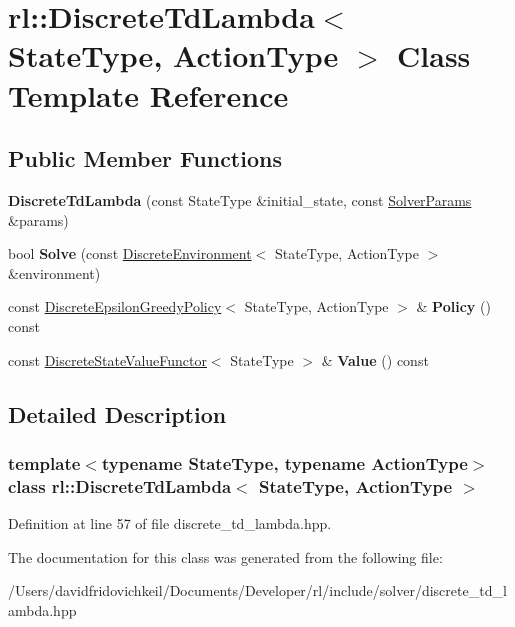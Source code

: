 \hypertarget{classrl_1_1_discrete_td_lambda}{}\section{rl\+:\+:Discrete\+Td\+Lambda$<$ State\+Type, Action\+Type $>$ Class Template Reference}
\label{classrl_1_1_discrete_td_lambda}
\subsection*{Public Member Functions}
\begin{DoxyCompactItemize}
\item 
\hypertarget{classrl_1_1_discrete_td_lambda_a899c3819e15973a6d78c0606c5f3dfb8}{}\label{classrl_1_1_discrete_td_lambda_a899c3819e15973a6d78c0606c5f3dfb8} 
{\bfseries Discrete\+Td\+Lambda} (const State\+Type \&initial\+\_\+state, const \hyperlink{structrl_1_1_solver_params}{Solver\+Params} \&params)
\item 
\hypertarget{classrl_1_1_discrete_td_lambda_a9458f4514c9cabe6083d54f7d9d195d4}{}\label{classrl_1_1_discrete_td_lambda_a9458f4514c9cabe6083d54f7d9d195d4} 
bool {\bfseries Solve} (const \hyperlink{classrl_1_1_discrete_environment}{Discrete\+Environment}$<$ State\+Type, Action\+Type $>$ \&environment)
\item 
\hypertarget{classrl_1_1_discrete_td_lambda_a2415e7f327ed838cac5d792d95dc1cb7}{}\label{classrl_1_1_discrete_td_lambda_a2415e7f327ed838cac5d792d95dc1cb7} 
const \hyperlink{classrl_1_1_discrete_epsilon_greedy_policy}{Discrete\+Epsilon\+Greedy\+Policy}$<$ State\+Type, Action\+Type $>$ \& {\bfseries Policy} () const
\item 
\hypertarget{classrl_1_1_discrete_td_lambda_a7feeec5e60b3ab723e957e767af95211}{}\label{classrl_1_1_discrete_td_lambda_a7feeec5e60b3ab723e957e767af95211} 
const \hyperlink{structrl_1_1_discrete_state_value_functor}{Discrete\+State\+Value\+Functor}$<$ State\+Type $>$ \& {\bfseries Value} () const
\end{DoxyCompactItemize}


\subsection{Detailed Description}
\subsubsection*{template$<$typename State\+Type, typename Action\+Type$>$\newline
class rl\+::\+Discrete\+Td\+Lambda$<$ State\+Type, Action\+Type $>$}



Definition at line 57 of file discrete\+\_\+td\+\_\+lambda.\+hpp.



The documentation for this class was generated from the following file\+:\begin{DoxyCompactItemize}
\item 
/\+Users/davidfridovichkeil/\+Documents/\+Developer/rl/include/solver/discrete\+\_\+td\+\_\+lambda.\+hpp\end{DoxyCompactItemize}
